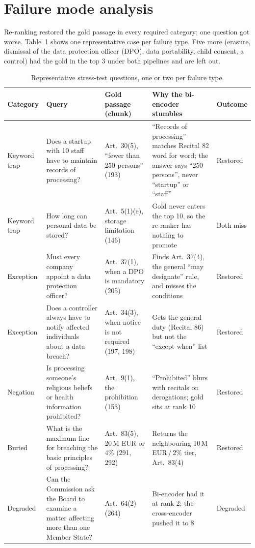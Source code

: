 \documentclass[10pt,a4paper]{article}
\begin{document}
\section{Failure mode analysis}

Re-ranking restored the gold passage in every required category; one question got worse. Table~1 shows one
representative case per failure type. Five more (erasure, dismissal of the data protection officer (DPO), data
portability, child consent, a control) had the gold in the top 3 under both pipelines and are left out.

\begin{table}[!htbp]
\centering\scriptsize
\begin{tabularx}{\textwidth}{@{}p{1.3cm}>{\raggedright\arraybackslash}p{4.1cm}>{\raggedright\arraybackslash}p{3.1cm}L>{\raggedright\arraybackslash}p{1.25cm}@{}}
\toprule
\textbf{Category} & \textbf{Query} & \textbf{Gold passage (chunk)} & \textbf{Why the bi-encoder stumbles} & \textbf{Outcome} \\
\midrule
Keyword trap & Does a startup with 10 staff have to maintain records of processing? & Art.~30(5), ``fewer than 250 persons'' (193) & ``Records of processing'' matches Recital 82 word for word; the answer says ``250 persons'', never ``startup'' or ``staff'' & \textcolor{restored}{Restored} \\
Keyword trap & How long can personal data be stored? & Art.~5(1)(e), storage limitation (146) & Gold never enters the top 10, so the re-ranker has nothing to promote & Both miss \\
Exception & Must every company appoint a data protection officer? & Art.~37(1), when a DPO is mandatory (205) & Finds Art.~37(4), the general ``may designate'' rule, and misses the conditions & \textcolor{restored}{Restored} \\
Exception & Does a controller always have to notify affected individuals about a data breach? & Art.~34(3), when notice is not required (197, 198) & Gets the general duty (Recital 86) but not the ``except when'' list & \textcolor{restored}{Restored} \\
Negation & Is processing someone's religious beliefs or health information prohibited? & Art.~9(1), the prohibition (153) & ``Prohibited'' blurs with recitals on derogations; gold sits at rank 10 & \textcolor{restored}{Restored} \\
Buried & What is the maximum fine for breaching the basic principles of processing? & Art.~83(5), 20\,M EUR or 4\% (291, 292) & Returns the neighbouring 10\,M EUR\,/\,2\% tier, Art.~83(4) & \textcolor{restored}{Restored} \\
Degraded & Can the Commission ask the Board to examine a matter affecting more than one Member State? & Art.~64(2) (264) & Bi-encoder had it at rank 2; the cross-encoder pushed it to 8 & \textcolor{degraded}{Degraded} \\
\bottomrule
\end{tabularx}
\caption{Representative stress-test questions, one or two per failure type.}
\end{table}
\end{document}
